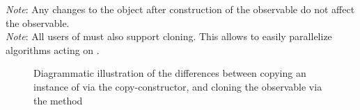 \emph{Note}: Any changes to the  object  after construction of the observable
do not affect the observable.\\


\emph{Note}: All users of  must also support cloning. This allows to easily
parallelize algorithms acting on .

\begin{figure}
    \caption{%
        Diagrammatic illustration of the differences between copying an instance of
         via the copy-constructor, and cloning the observable via the 
        method
    }
\end{figure}
